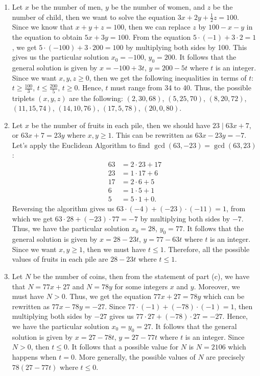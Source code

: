 \begin{solution}
    \begin{enumerate}
        \item Let $x$ be the number of men, $y$ be the number of women, and $z$ be the number of child, then we want to solve the equation $3x + 2y + \frac{1}{2}z = 100$. Since we know that $x + y + z = 100$, then we can replace $z$ by $100 - x - y$ in the equation to obtain $5x + 3y = 100$. From the equation $5 \cdot (-1) + 3 \cdot 2 = 1$, we get $5 \cdot (-100) + 3 \cdot 200 = 100$ by multiplying both sides by 100. This gives us the particular solution $x_0 = -100$, $y_0 = 200$. It follows that the general solution is given by $x = -100 + 3t$, $y = 200 - 5t$ where $t$ is an integer. Since we want $x,y,z \geq 0$, then we get the following inequalities in terms of $t$: $t \geq \frac{100}{3}$, $t \leq \frac{200}{5}$, $t \geq 0$. Hence, $t$ must range from 34 to 40. Thus, the possible triplets $(x,y,z)$ are the following: $(2,30,68)$, $(5, 25, 70)$, $(8, 20, 72)$, $(11, 15, 74)$, $(14, 10, 76)$, $(17, 5, 78)$, $(20, 0, 80)$.
        \item Let $x$ be the number of fruits in each pile, then we should have $23 \mid 63x + 7$, or $63x + 7 = 23y$ where $x,y \geq 1$. This can be rewritten as $63x - 23y = -7$. Let's apply the Euclidean Algorithm to find $\gcd(63, -23) = \gcd(63, 23)$:
        \begin{align*}
            63 &= 2 \cdot 23 + 17 \\
            23 &= 1 \cdot 17 + 6 \\
            17 &= 2 \cdot 6 + 5 \\
            6 &= 1 \cdot 5 + 1 \\
            5 &= 5 \cdot 1 + 0.
        \end{align*}
        Reversing the algorithm gives us $63 \cdot (-4) + (-23)\cdot (-11) = 1$, from which we get $63 \cdot 28 + (-23) \cdot 77 = -7$ by multiplying both sides by $-7$. Thus, we have the particular solution $x_0 = 28$, $y_0 = 77$. It follows that the general solution is given by $x = 28 - 23t$, $y = 77 - 63 t$ where $t$ is an integer. Since we want $x, y \geq 1$, then we must have $t \leq 1$. Therefore, all the possible values of fruits in each pile are $28 - 23t$ where $t \leq 1$.
        \item Let $N$ be the number of coins, then from the statement of part (c), we have that $N = 77x + 27$ and $N = 78y$ for some integers $x$ and $y$. Moreover, we must have $N > 0$. Thus, we get the equation $77x + 27 = 78y$ which can be rewritten as $77x - 78y = -27$. Since $77 \cdot (-1) + (-78) \cdot (-1) = 1$, then multiplying both sides by $-27$ gives us $77 \cdot 27 + (-78) \cdot 27 = -27$. Hence, we have the particular solution $x_0 = y_0 = 27$. It follows that the general solution is given by $x = 27 - 78t$, $y = 27 - 77t$ where $t$ is an integer. Since $N > 0$, then $t \leq 0$. It follows that a possible value for $N$ is $N = 2106$ which happens when $t = 0$. More generally, the possible values of $N$ are precisely $78(27 - 77t)$ where $t \leq 0$.

\end{enumerate}
\end{solution}
